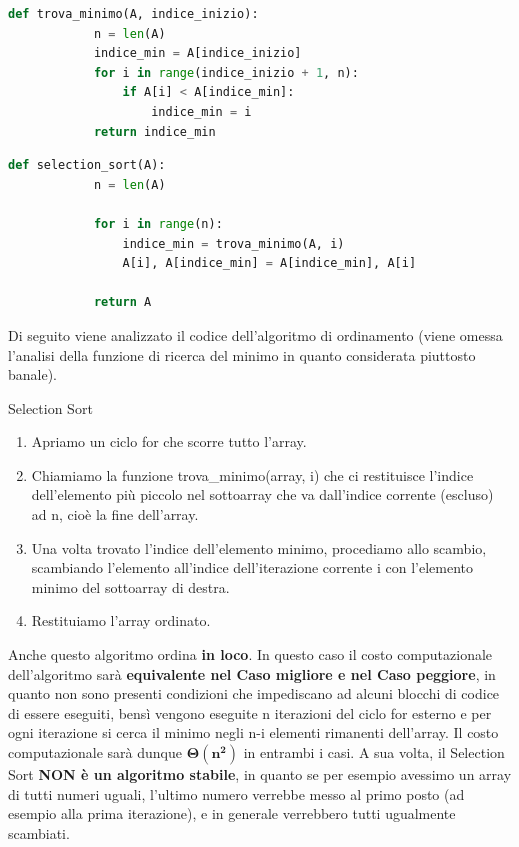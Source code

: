 \documentclass[12pt]{report}
\begin{document}
    \begin{lstlisting}[caption={Funzione ausiliaria "trova\_minimo"},language=Python]
    	def trova_minimo(A, indice_inizio):
    		n = len(A)
    		indice_min = A[indice_inizio]
    		for i in range(indice_inizio + 1, n):
    			if A[i] < A[indice_min]:
    				indice_min = i
    		return indice_min
    \end{lstlisting}
    
    \begin{lstlisting}[caption={Selection Sort}, language=Python]
    	def selection_sort(A):
    		n = len(A)
    		
    		for i in range(n):
    			indice_min = trova_minimo(A, i)
    			A[i], A[indice_min] = A[indice_min], A[i]
    			
    		return A
    \end{lstlisting}
    		
    Di seguito viene analizzato il codice dell'algoritmo di ordinamento (viene omessa l'analisi della funzione di ricerca del minimo in quanto considerata piuttosto banale).
    \begin{algoritmo}{Selection Sort}{}
    			
    	\begin{enumerate}
    				
    		\item Apriamo un ciclo for che scorre tutto l’array.
    
    		\item Chiamiamo la funzione trova\_minimo(array, i) che ci restituisce l’indice dell’elemento più piccolo nel sottoarray che va dall’indice corrente (escluso) ad n, cioè la fine dell’array.
    
    		\item Una volta trovato l’indice dell’elemento minimo, procediamo allo scambio, scambiando l’elemento all’indice dell’iterazione corrente i con l’elemento minimo del sottoarray di destra.
    
    		\item Restituiamo l’array ordinato.
    				
    	\end{enumerate}
    			
    \end{algoritmo}
    		
    Anche questo algoritmo ordina \textbf{in loco}.
    In questo caso il costo computazionale dell’algoritmo sarà \textbf{equivalente nel Caso migliore e nel Caso peggiore}, in quanto non sono presenti condizioni che impediscano ad alcuni blocchi di codice di essere eseguiti, bensì vengono eseguite n iterazioni del ciclo for esterno e per ogni iterazione si cerca il minimo negli n-i elementi rimanenti dell’array. Il costo computazionale sarà dunque $\mathbf{\Theta(n^2)}$ in entrambi i casi.
    A sua volta, il Selection Sort \textbf{NON è un algoritmo stabile}, in quanto se per esempio avessimo un array di tutti numeri uguali, l’ultimo numero verrebbe messo al primo posto (ad esempio alla prima iterazione), e in generale verrebbero tutti ugualmente scambiati.
    	
\end{document}
